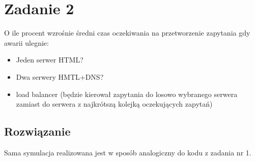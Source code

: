 \documentclass[12pt,oneside,a4paper]{book} %
\theoremstyle{break}
\begin{document}
\chapter*{Zadanie 2}

O ile procent wzrośnie średni czas oczekiwania na przetworzenie zapytania gdy awarii ulegnie:
\begin{itemize}
  \item Jeden serwer HTML?
  \item Dwa serwery HMTL+DNS?
  \item load balancer (będzie kierował zapytania do losowo wybranego serwera zamiast do serwera z najkrótszą kolejką oczekujących zapytań)
\end{itemize}

\section*{Rozwiązanie}

Sama symulacja realizowana jest w sposób analogiczny do kodu z zadania nr 1.
\end{document}
